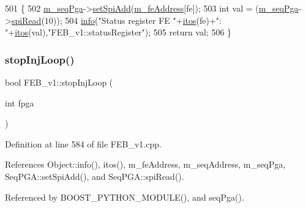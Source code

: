 \begin{DoxyCode}
501                                 \{  
502   \hyperlink{classFEB__v1_a6c7804ac86796f233a8393043adf2e77}{m\_seqPga}->\hyperlink{classSeqPGA_ac998ce3a6d9b5f2e88cc8393f8c1df53}{setSpiAdd}(\hyperlink{classFEB__v1_a4e1945c2d5b434125f375e9d0fc6d99f}{m\_feAddress}[fe]);
503   \textcolor{keywordtype}{int} val = (\hyperlink{classFEB__v1_a6c7804ac86796f233a8393043adf2e77}{m\_seqPga}->\hyperlink{classSeqPGA_ab3d0e5e5d4014bc7a92588a76b8713d4}{spiRead}(10));
504   \hyperlink{classObject_a644fd329ea4cb85f54fa6846484b84a8}{info}(\textcolor{stringliteral}{"Status register FE "}+\hyperlink{Tools_8h_af330027dbdafb9a30768b3613c553e60}{itos}(fe)+\textcolor{stringliteral}{": "}+\hyperlink{Tools_8h_af330027dbdafb9a30768b3613c553e60}{itos}(val),\textcolor{stringliteral}{"FEB\_v1::statusRegister"});
505   \textcolor{keywordflow}{return} val;
506 \}
\end{DoxyCode}
\mbox{\label{classFEB__v1_abfd23d8fbcea0415a7e8401110869a78}} 
\subsubsection{\texorpdfstring{stop\+Inj\+Loop()}{stopInjLoop()}}
{\footnotesize\ttfamily bool F\+E\+B\+\_\+v1\+::stop\+Inj\+Loop (\begin{DoxyParamCaption}\item[{int}]{fpga }\end{DoxyParamCaption})}



Definition at line 584 of file F\+E\+B\+\_\+v1.\+cpp.



References Object\+::info(), itos(), m\+\_\+fe\+Address, m\+\_\+seq\+Address, m\+\_\+seq\+Pga, Seq\+P\+G\+A\+::set\+Spi\+Add(), and Seq\+P\+G\+A\+::spi\+Read().



Referenced by B\+O\+O\+S\+T\+\_\+\+P\+Y\+T\+H\+O\+N\+\_\+\+M\+O\+D\+U\+L\+E(), and seq\+Pga().


